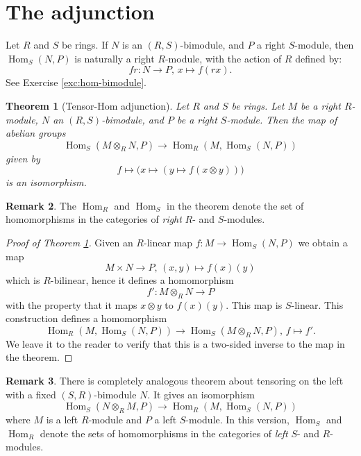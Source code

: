 \documentclass[11pt]{amsbook}
\DeclareMathOperator\Hom{Hom}
\theoremstyle{plain}
\newtheorem{theorem}{Theorem}
\theoremstyle{definition}
\newtheorem{remark}[theorem]{Remark}
\begin{document}
\section{The adjunction}

Let $R$ and $S$ be rings. If $N$ is an $(R,S)$-bimodule, and $P$ a right $S$-module, then $\Hom_S(N,P)$ is naturally a right $R$-module, with the action of $R$ defined by:
\[
	fr\colon N \to P,\, x \mapsto f(rx).
\]
See Exercise \ref{exc:hom-bimodule}.


\begin{theorem}[Tensor-Hom adjunction]\label{thm:tensor-hom-adjunction}
Let $R$ and $S$ be rings. Let $M$ be a right $R$-module, $N$ an $(R,S)$-bimodule, and $P$ be a right $S$-module. Then the map of abelian groups
\[
	\Hom_S(M\otimes_R N, P) \to \Hom_R(M,\Hom_S(N,P))
\]
given by
\[
	f \mapsto \big( x \mapsto ( y \mapsto f(x\otimes y) )\big)
\]
is an isomorphism.
\end{theorem}

\begin{remark}
The $\Hom_R$ and $\Hom_S$ in the theorem denote the set of homomorphisms in the categories of \emph{right} $R$- and $S$-modules. 
\end{remark}


\begin{proof}[Proof of Theorem \ref{thm:tensor-hom-adjunction}]
Given an $R$-linear map $f\colon M\to \Hom_S(N,P)$ we obtain a map
\[
	M\times N \to P,\,  (x,y) \mapsto f(x)(y)
\]
which is $R$-bilinear, hence it defines a homomorphism
\[
	f'\colon M\otimes_R N \to P
\]
with the property that it maps $x\otimes y$ to $f(x)(y)$. This map is $S$-linear. This construction defines a homomorphism 
\[
	\Hom_R(M,\Hom_S(N,P)) \to \Hom_S(M\otimes_R N, P),\, f\mapsto f'.
\]
We leave it to the reader to verify that this is a two-sided inverse to the map in the theorem.
\end{proof}

\begin{remark}\label{thm:alternate-adjunction}
There is completely analogous theorem about tensoring on the left with a fixed $(S,R)$-bimodule $N$. It gives an isomorphism
\[
	\Hom_S(N\otimes_R M, P) \to \Hom_R(M, \Hom_S(N,P))
\]
where $M$ is a left $R$-module and $P$ a left $S$-module. In this version, $\Hom_S$ and $\Hom_R$ denote the sets of homomorphisms in the categories of \emph{left} $S$- and $R$-modules.
\end{remark}
\end{document}
